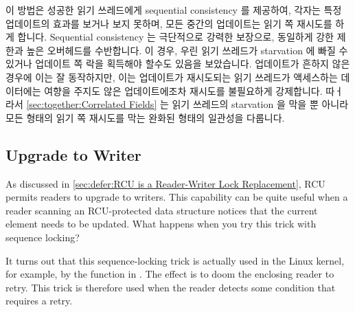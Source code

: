 이 방법은 성공한 읽기 쓰레드에게 sequential consistency 를 제공하여, 각자는
특정 업데이트의 효과를 보거나 보지 못하며, 모든 중간의 업데이트는 읽기 쪽
재시도를 하게 합니다.
Sequential consistency 는 극단적으로 강력한 보장으로, 동일하게 강한 제한과 높은
오버헤드를 수반합니다.
이 경우, 우린 읽기 쓰레드가 starvation 에 빠질 수 있거나 업데이트 쪽 락을
획득해야 할수도 있음을 보았습니다.
업데이트가 흔하지 않은 경우에 이는 잘 동작하지만, 이는 업데이트가 재시도되는
읽기 쓰레드가 액세스하는 데이터에는 여향을 주지도 않은 업데이트에조차 재시도를
불필요하게 강제합니다.
따ㅓ라서 \cref{sec:together:Correlated Fields} 는 읽기 쓰레드의 starvation 을
막을 뿐 아니라 모든 형태의 읽기 쪽 재시도를 막는 완화된 형태의 일관성을
다룹니다.

\iffalse

Another approach is to shard the data elements, and then have each update
write-acquire all the sequence locks needed to cover the data elements
affected by that update.
Of course, these write acquisitions must be done carefully in order to
avoid deadlock.
Readers would also need to read-acquire multiple sequence locks, but
in the surprisingly common case where readers only look up one data
element, only one sequence lock need be read-acquired.

This approach provides sequential consistency to successful readers,
each of which will either see the effects of a given update or not,
with any partial updates resulting in a read-side retry.
Sequential consistency is an extremely strong guarantee, incurring equally
strong restrictions and equally high overheads.
In this case, we saw that readers might be starved on the one hand, or
might need to acquire the update-side lock on the other.
Although this works very well in cases where updates are infrequent,
it unnecessarily forces read-side retries even when the update does not
affect any of the data that a retried reader accesses.
\Cref{sec:together:Correlated Fields} therefore covers a much weaker form
of consistency that not only avoids reader starvation, but also avoids
any form of read-side retry.

\fi

\subsection{Upgrade to Writer}
\label{sec:together:Upgrade to Writer}

As discussed in
\cref{sec:defer:RCU is a Reader-Writer Lock Replacement},
RCU permits readers to upgrade to writers.
This capability can be quite useful when a reader scanning an
RCU-protected data structure notices that the current element
needs to be updated.
What happens when you try this trick with sequence locking?

It turns out that this sequence-locking trick is actually used in
the Linux kernel, for example, by the  function in
.
The effect is to doom the enclosing reader to retry.
This trick is therefore used when the reader detects some condition
that requires a retry.
